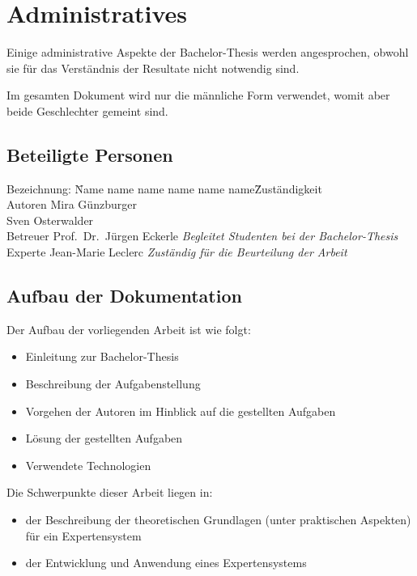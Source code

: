 \chapter{Administratives}
\label{chap:administratives}
Einige administrative Aspekte der Bachelor-Thesis werden angesprochen, obwohl sie für das Verständnis der Resultate nicht notwendig sind.

Im gesamten Dokument wird nur die männliche Form verwendet, womit aber beide Geschlechter gemeint sind.

\section{Beteiligte Personen}
\label{sec:admin_beteiligte}
\begin{tabbing} %
Bezeichnung: \= Name name name name name name\= Zuständigkeit \kill \\
    Autoren         \> Mira Günzburger\protect\footnotemark[1]{}    \> \\
                    \> Sven Osterwalder\protect\footnotemark[2]{} \> \\
    Betreuer        \> Prof.\ Dr.\ Jürgen Eckerle\protect\footnotemark[3]{}  \> \textit{Begleitet Studenten bei der Bachelor-Thesis}\\
    Experte         \> Jean-Marie Leclerc   \> \textit{Zuständig für die Beurteilung der Arbeit}
\end{tabbing}

\section{Aufbau der Dokumentation}
\label{sec:admin_aufbau}
Der Aufbau der vorliegenden Arbeit ist wie folgt:
\begin{itemize}
    \item Einleitung zur Bachelor-Thesis
    \item Beschreibung der Aufgabenstellung
    \item Vorgehen der Autoren im Hinblick auf die gestellten Aufgaben
    \item Lösung der gestellten Aufgaben
    \item Verwendete Technologien
\end{itemize}

Die Schwerpunkte dieser Arbeit liegen in:
\begin{itemize}
    \item der Beschreibung der theoretischen Grundlagen (unter praktischen Aspekten) für ein Expertensystem
    \item der Entwicklung und Anwendung eines Expertensystems
\end{itemize}

